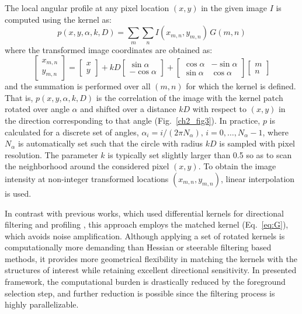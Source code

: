 The local angular profile at any pixel location $(x,y)$ in the given image $I$ is computed using the kernel as:
\begin{equation}
p(x,y,\alpha,k,D)=\sum_{m}\sum_{n} I(x_{m,n},y_{m,n})\,G(m,n)
\label{ch2:eq:angularprofile}
\end{equation}
where the transformed image coordinates are obtained as:
\begin{equation}
\begin{bmatrix} x_{m,n} \\ y_{m,n} \end{bmatrix} =
\begin{bmatrix} x \\ y \end{bmatrix} +
kD\begin{bmatrix} \sin\alpha \\ -\!\cos\alpha \end{bmatrix} +
\begin{bmatrix} \cos\alpha & -\!\sin\alpha \\ \sin\alpha & \cos\alpha \end{bmatrix}
\begin{bmatrix} m \\ n \end{bmatrix}
\label{eq:xymn}
\end{equation}
and the summation is performed over all $(m,n)$ for which the kernel is defined. That is, $p(x,y,\alpha,k,D)$ is the correlation of the image with the kernel patch rotated over angle $\alpha$ and shifted over a distance $kD$ with respect to $(x,y)$ in the direction corresponding to that angle (Fig.~\ref{ch2_fig3}). In practice, $p$ is calculated for a discrete set of angles, $\alpha_{i}=i/(2\pi N_{\alpha}),\, i=0,\dots,N_{\alpha}-1$, where $N_{\alpha}$ is automatically set such that the circle with radius $kD$ is sampled with pixel resolution. The parameter $k$ is typically set slightly larger than 0.5 so as to scan the neighborhood around the considered pixel $(x,y)$. To obtain the image intensity at non-integer transformed locations $(x_{m,n},y_{m,n})$, linear interpolation is used.

In contrast with previous works, which used differential kernels for directional filtering and profiling \cite{yu1998rotated, can1999rapid, zhang2007automated}, this approach employs the matched kernel (Eq.~\ref{eq:G}), which avoids noise amplification. Although applying a set of rotated kernels is computationally more demanding than Hessian or steerable filtering based methods, it provides more geometrical flexibility in matching the kernels with the structures of interest while retaining excellent directional sensitivity. In presented framework, the computational burden is drastically reduced by the foreground selection step, and further reduction is possible since the filtering process is highly parallelizable.

